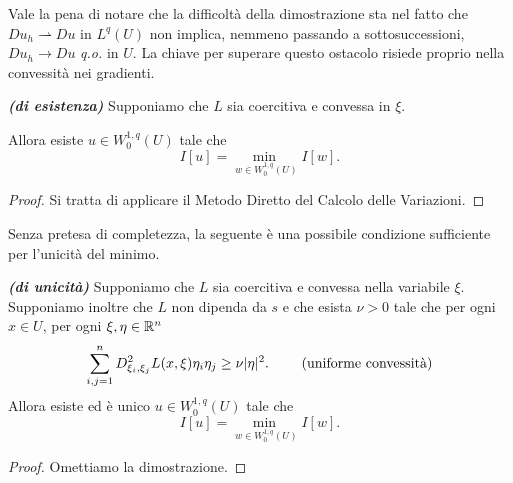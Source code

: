 \begin{osservazione}
	Vale la pena di notare che la difficoltà della dimostrazione sta nel fatto che $Du_h \rightharpoonup Du$ in $L^{q}(U)$ non implica, nemmeno passando a sottosuccessioni, $Du_h \to Du$ \emph{q.o.} in $U$. La chiave per superare questo ostacolo risiede proprio nella convessità nei gradienti.
\end{osservazione}
\begin{teorema}\textbf{\emph{(di esistenza)}}
	Supponiamo che $L$ sia coercitiva e convessa in $\xi$. 
	
	Allora esiste $u \in W^{1,q}_0(U)$ tale che 
	\[ I[u] = \underset{w \in W^{1,q}_0(U)}{\min \;}I[w]. \]
\end{teorema}
\begin{proof}
	Si tratta di applicare il Metodo Diretto del Calcolo delle Variazioni.
\end{proof}
Senza pretesa di completezza, la seguente è una possibile condizione sufficiente per l'unicità del minimo.
\begin{teorema}\textbf{\emph{(di unicità)}}
	Supponiamo che $L$ sia coercitiva e convessa nella variabile $\xi$. Supponiamo inoltre che $L$ non dipenda da $s$ e che esista $\nu > 0 $ tale che per ogni $x \in U$, per ogni $\xi,\eta \in \mathbb{R}^n$
	\[ \sum_{i,j=1}^n D^2_{\xi_i,\xi_j}L(x,\xi)\eta_i\eta_j \ge \nu \lvert\eta\rvert^2. \qquad \textup{ (uniforme convessità)} \]
	Allora esiste ed è unico $u \in W^{1,q}_0(U)$ tale che 
	\[ I[u] = \underset{w \in W^{1,q}_0(U)}{\min \;}I[w]. \]
\end{teorema}
\begin{proof}
	Omettiamo la dimostrazione.
\end{proof}

